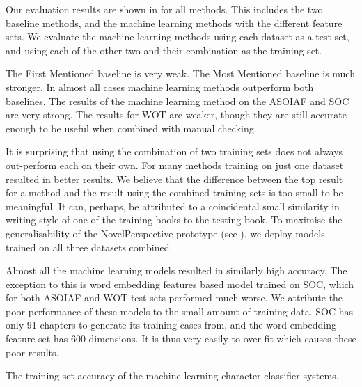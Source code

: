 \documentclass[11pt,a4paper]{article}
\begin{document}
Our evaluation results are shown in  for all methods.
This includes the two baseline methods, and the machine learning methods with the different feature sets.
We evaluate the machine learning methods using each dataset as a test set, and using each of the other two and their combination as the training set.

The First Mentioned baseline is very weak.
The Most Mentioned baseline is much stronger.
In almost all cases machine learning methods outperform both baselines.
The results of the machine learning method on the ASOIAF and SOC are very strong.
The results for WOT are weaker, though they are still accurate enough to be useful when combined with manual checking.


It is surprising that using the combination of two training sets does not always out-perform each on their own.
For many methods training on just one dataset resulted in better results.
We believe that the difference between the top result for a method and the result using the combined training sets is too small to be meaningful.
It can, perhaps, be attributed to a coincidental small similarity in writing style of one of the training books to the testing book.
To maximise the generalisability of the NovelPerspective prototype (see ), we deploy models trained on all three datasets combined.

Almost all the machine learning models resulted in similarly high accuracy.
The exception to this is word embedding features based model trained on SOC, which for both ASOIAF and WOT test sets performed much worse.
We attribute the poor performance of these models to the small amount of training data.
SOC has only 91 chapters to generate its training cases from, and the word embedding feature set has 600 dimensions.
It is thus very easily to over-fit which causes these poor results.


\begin{table}
	\begin{adjustbox}{max width=\columnwidth}
		\small
		
	\end{adjustbox}
	
	\caption{The training set accuracy of the machine learning character classifier systems.
	} \label{tbl:restrain}
\end{table}
\end{document}
